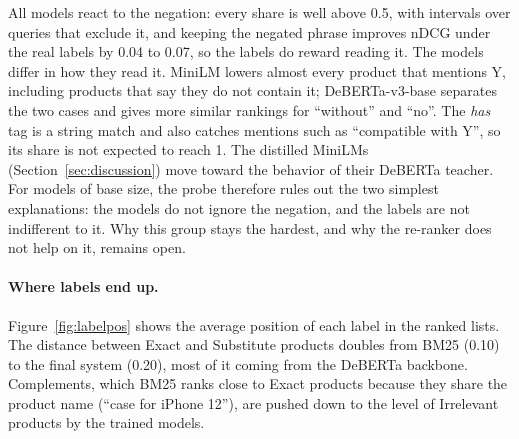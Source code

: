\documentclass[12pt,a4paper]{report}
\begin{document}
\begin{table}[H]
\centering
\caption{Negation probe on 129 validation queries (ranges over seeds). \emph{Has} lower: share of products that contain Y scored lower when Y is excluded (114 queries with such products). \emph{Negated} higher: share of products that state ``no Y'' scored higher (67 queries). $\tau$: agreement of the rankings for ``without'' and ``no''. $\Delta$nDCG: nDCG of the query as written minus that of the query without the negated phrase.}
\label{tab:negprobe}
\small
{}
\end{table}

All models react to the negation: every share is well above 0.5, with intervals over queries that exclude it, and keeping the negated phrase improves nDCG under the real labels by 0.04 to 0.07, so the labels do reward reading it. The models differ in how they read it. MiniLM lowers almost every product that mentions Y, including products that say they do not contain it; DeBERTa-v3-base separates the two cases and gives more similar rankings for ``without'' and ``no''. The \emph{has} tag is a string match and also catches mentions such as ``compatible with Y'', so its share is not expected to reach 1. The distilled MiniLMs (Section~\ref{sec:discussion}) move toward the behavior of their DeBERTa teacher. For models of base size, the probe therefore rules out the two simplest explanations: the models do not ignore the negation, and the labels are not indifferent to it. Why this group stays the hardest, and why the re-ranker does not help on it, remains open.

\paragraph{Where labels end up.} Figure~\ref{fig:labelpos} shows the average position of each label in the ranked lists. The distance between Exact and Substitute products doubles from BM25 (0.10) to the final system (0.20), most of it coming from the DeBERTa backbone. Complements, which BM25 ranks close to Exact products because they share the product name (``case for iPhone 12''), are pushed down to the level of Irrelevant products by the trained models.
\end{document}
